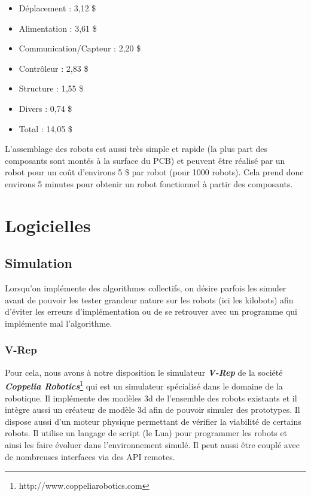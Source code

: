 \documentclass[a4paper,8pt]{report}
\begin{document}
\begin{itemize}
\item D\'eplacement : 3,12 \$
\item Alimentation : 3,61 \$
\item Communication/Capteur : 2,20 \$
\item Contr\^oleur : 2,83 \$
\item Structure : 1,55 \$
\item Divers : 0,74 \$
\item Total : 14,05 \$
\end{itemize}

\medskip
L'assemblage des robots est aussi tr\`es simple et rapide (la plus part des composants sont mont\'es \`a la  surface du PCB) et peuvent \^etre r\'ealis\'e par un robot pour un co\^ut d'environs 5 \$ par robot (pour 1000 robots). Cela prend donc environs 5 minutes pour obtenir un robot fonctionnel \`a partir des composants.\\

\section*{Logicielles}\label{sec:name}

\subsection*{Simulation}\label{subsec:name}

Lorsqu'on impl\'emente des algorithmes collectifs, on d\'esire parfois les simuler avant de pouvoir les tester grandeur nature sur les robots (ici les kilobots) afin d'\'eviter les erreurs d'impl\'ementation ou de se retrouver avec un programme qui impl\'emente mal l'algorithme. \\

\subsubsection*{V-Rep}\label{subsubsec:name}

Pour cela, nous avons \`a notre disposition le simulateur \textit{\textbf{V-Rep}} de la soci\'et\'e \textit{\textbf{Coppelia Robotics}}\footnote{http://www.coppeliarobotics.com} qui est un simulateur sp\'ecialis\'e dans le domaine de la robotique. Il impl\'emente des mod\`eles 3d de l'ensemble des robots existants et il int\`egre aussi un cr\'eateur de mod\`ele 3d afin de pouvoir simuler des prototypes. Il dispose aussi d'un moteur physique permettant de v\'erifier la viabilit\'e de certains robots. Il utilise un langage de script (le Lua) pour programmer les robots et ainsi les faire \'evoluer dans l'environnement simul\'e. Il peut aussi \^etre coupl\'e avec de nombreuses interfaces via des API remotes.\\
\end{document}
